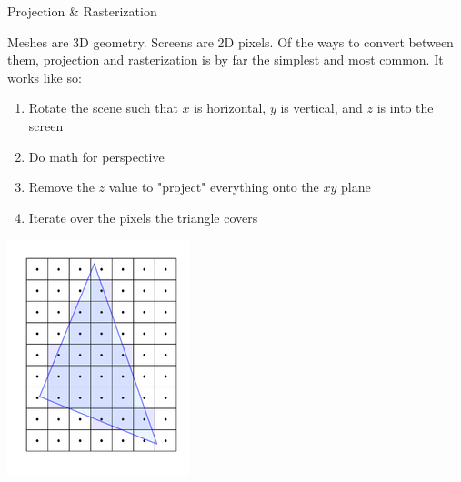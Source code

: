 \documentclass{lug}
\newcommand{\splitslide}[4]{
    \noindent
    \begin{minipage}{#1 \textwidth - #2 }
        #3
    \end{minipage}%
    \hspace{ \dimexpr #2 * 2 \relax }%
    \begin{minipage}{\textwidth - #1 \textwidth - #2 }
        #4
    \end{minipage}
}
\begin{document}
\begin{frame}{Projection \& Rasterization}
    \splitslide{0.65}{.7em}{
        \small

        Meshes are 3D geometry. Screens are 2D pixels. Of the ways to convert
        between them, projection and rasterization is by far the simplest and
        most common. It works like so:

        \begin{enumerate}
            \item Rotate the scene such that $x$ is horizontal, $y$ is vertical, and $z$ is into the screen
            \item Do math for perspective
            \item Remove the $z$ value to "project" everything onto the $xy$ plane
            \item Iterate over the pixels the triangle covers
        \end{enumerate}
    }{
        \includegraphics[width=\textwidth]{graphics/rasterization} \\
}
\end{frame}
\end{document}
